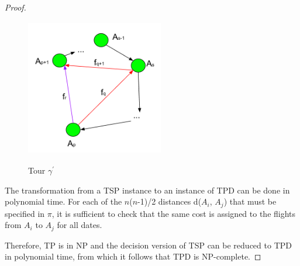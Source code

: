 \documentclass{article}
\theoremstyle{definition}
\begin{document}
\begin{proof}
\begin{figure}
\centering
\includegraphics[width=6cm, height=6cm]{images/routes.png}
\label{fig:routes}
\caption{Tour $\gamma^{\prime}$}
\end{figure}

The transformation from a TSP instance to an instance of TPD can be done in polynomial time. For each of the $n$($n$-1)/2 distances d($A_{i}$, $A_{j}$) that must be specified in $\pi$, it is sufficient to check that the same cost is assigned to the flights from $A_{i}$ to $A_{j}$ for all dates.

Therefore, TP is in NP and the decision version of TSP can be reduced to TPD in polynomial time, from which it follows that TPD is NP-complete.

\end{proof}



\end{document}
